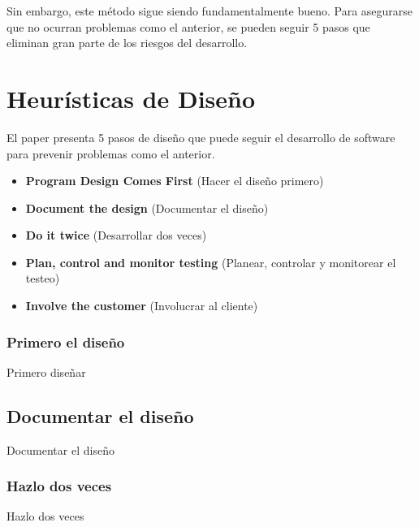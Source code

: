 \documentclass{beamer}
\begin{document}
\begin{frame}[fragile]

Sin embargo, este método sigue siendo fundamentalmente bueno. Para asegurarse que no ocurran problemas como el anterior, se pueden seguir 5 pasos que eliminan gran parte de los riesgos del desarrollo.

\end{frame}

\section{Heurísticas de Diseño}

\begin{frame}
El paper presenta 5 pasos de diseño que puede seguir el desarrollo de software para prevenir problemas como el anterior.

\begin{itemize}
\item<2-> \textbf{Program Design Comes First} (Hacer el diseño primero)
\item<3-> \textbf{Document the design} (Documentar el diseño)
\item<4-> \textbf{Do it twice} (Desarrollar dos veces)
\item<5-> \textbf{Plan, control and monitor testing} (Planear, controlar y monitorear el testeo)
\item<6-> \textbf{Involve the customer} (Involucrar al cliente)
\end{itemize}

\end{frame}

\subsubsection{Primero el diseño}

\begin{frame}{Primero diseñar}

\end{frame}

\subsection{Documentar el diseño}

\begin{frame}{Documentar el diseño}

\end{frame}

\subsubsection{Hazlo dos veces}
\begin{frame}{Hazlo dos veces}

\end{frame}
\end{document}
